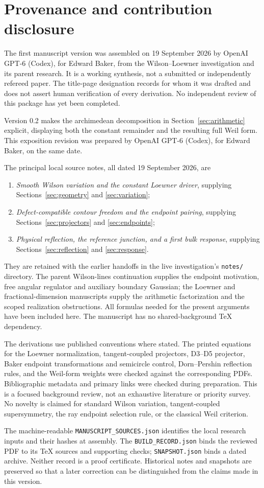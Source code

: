 \section{Provenance and contribution disclosure}\label{app:provenance}

The first manuscript version was assembled on 19 September 2026
by OpenAI GPT-6 (Codex), for Edward Baker, from the Wilson--Loewner
investigation and its parent research. It is a working synthesis,
not a submitted or independently refereed paper. The title-page
designation records for whom it was drafted and does not assert
human verification of every derivation. No independent review of
this package has yet been completed.

Version 0.2 makes the archimedean decomposition in
Section~\ref{sec:arithmetic} explicit, displaying both the constant
remainder and the resulting full Weil form. This exposition revision
was prepared by OpenAI GPT-6 (Codex), for Edward Baker, on the same date.

The principal local source notes, all dated 19 September 2026, are
\begin{enumerate}
 \item \emph{Smooth Wilson variation and the constant Loewner driver},
 supplying Sections~\ref{sec:geometry} and \ref{sec:variation};
 \item \emph{Defect-compatible contour freedom and the endpoint pairing},
 supplying Sections~\ref{sec:projectors} and \ref{sec:endpoints};
 \item \emph{Physical reflection, the reference junction, and a first
 bulk response}, supplying Sections~\ref{sec:reflection} and
 \ref{sec:response}.
\end{enumerate}
They are retained with the earlier handoffs in the live investigation's
\texttt{notes/} directory. The parent Wilson-lines continuation supplies
the endpoint motivation, free angular regulator and auxiliary boundary
Gaussian; the Loewner and fractional-dimension manuscripts supply
the arithmetic factorization and the scoped realization obstructions.
All formulas needed for the present arguments have been included
here. The manuscript has no shared-background TeX dependency.

The derivations use published conventions where stated. The printed
equations for the Loewner normalization, tangent-coupled projectors,
D3--D5 projector, Baker endpoint transformations and semicircle
control, Dorn--Pershin reflection rules, and the Weil-form weights
were checked against the corresponding PDFs. Bibliographic metadata
and primary links were checked during preparation. This is a focused
background review, not an exhaustive literature or priority survey.
No novelty is claimed for standard Wilson variation, tangent-coupled
supersymmetry, the ray endpoint selection rule, or the classical
Weil criterion.

The machine-readable \nolinkurl{MANUSCRIPT_SOURCES.json} identifies
the local research inputs and their hashes at assembly. The
\nolinkurl{BUILD_RECORD.json} binds the reviewed PDF to its TeX
sources and supporting checks; \nolinkurl{SNAPSHOT.json} binds a
dated archive. Neither record is a proof certificate. Historical
notes and snapshots are preserved so that a later correction can
be distinguished from the claims made in this version.
